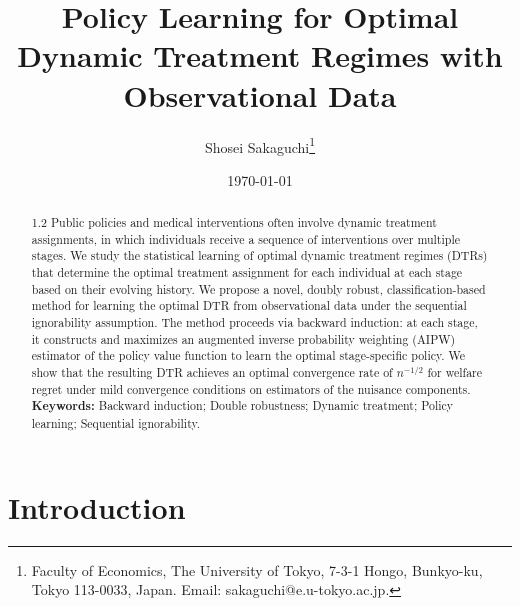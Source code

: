 \title{Policy Learning for Optimal Dynamic Treatment Regimes with Observational Data} 


\author{Shosei Sakaguchi\thanks{Faculty of Economics, The University of Tokyo, 7-3-1 Hongo, Bunkyo-ku, Tokyo 113-0033, Japan. Email: sakaguchi@e.u-tokyo.ac.jp.} }
\date{\today}

\maketitle
\thispagestyle{empty}

\vspace{-1cm}

\begin{abstract}
\begin{spacing}{1.2}
   Public policies and medical interventions often involve dynamic treatment assignments, in which individuals receive a sequence of interventions over multiple stages. We study the statistical learning of optimal dynamic treatment regimes (DTRs) that determine the optimal treatment assignment for each individual at each stage based on their evolving history. We propose a novel, doubly robust, classification-based method for learning the optimal DTR from observational data under the sequential ignorability assumption. The method proceeds via backward induction: at each stage, it constructs and maximizes an augmented inverse probability weighting (AIPW) estimator of the policy value function to learn the optimal stage-specific policy. We show that the resulting DTR achieves an optimal convergence rate of $n^{-1/2}$ for welfare regret under mild convergence conditions on estimators of the nuisance components.
    \bigskip \\
\noindent 
\textbf{Keywords:} Backward induction; Double robustness; Dynamic treatment; Policy learning; Sequential ignorability. \\
\end{spacing}
\end{abstract}

\thispagestyle{empty}
\clearpage
{} 


\section{Introduction} \label{sec:introduction}


